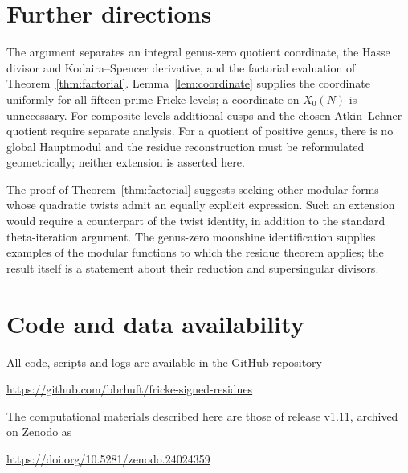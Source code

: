 \documentclass[11pt,a4paper]{article}
\numberwithin{equation}{section}
\theoremstyle{definition}
\theoremstyle{remark}
\begin{document}
\section{Further directions}
The argument separates an integral genus-zero quotient coordinate, the
Hasse divisor and Kodaira--Spencer derivative, and the factorial
evaluation of Theorem~\ref{thm:factorial}.
Lemma~\ref{lem:coordinate} supplies the coordinate uniformly for all
fifteen prime Fricke levels; a coordinate on $X_0(N)$ is unnecessary.
For composite levels additional cusps and the chosen Atkin--Lehner
quotient require separate analysis. For a quotient of positive genus,
there is no global Hauptmodul and the residue reconstruction must be
reformulated geometrically; neither extension is asserted here.

The proof of Theorem~\ref{thm:factorial} suggests seeking other modular
forms whose quadratic twists admit an equally explicit expression.
Such an extension would require a counterpart of the twist identity,
in addition to the standard theta-iteration argument. The genus-zero
moonshine identification supplies examples of the modular functions
to which the residue theorem applies; the result itself is a statement
about their reduction and supersingular divisors.

\section*{Code and data availability}
All code, scripts and logs are available in the GitHub repository
\begin{center}\url{https://github.com/bbrhuft/fricke-signed-residues}\end{center}
The computational materials described here are those of release v1.11, archived on Zenodo as
\begin{center}\href{https://doi.org/10.5281/zenodo.24024359}{https://doi.org/10.5281/zenodo.24024359}\end{center}
\end{document}
